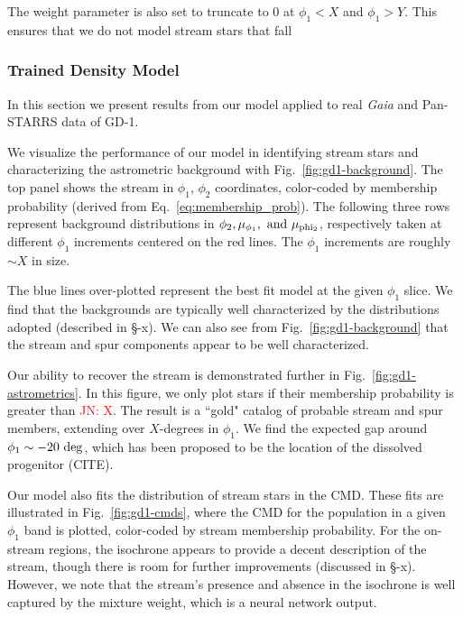 \documentclass[twocolumn]{aastex631}
\newcommand{\JN}[1]{{\textcolor{red}{JN: #1}}}
\begin{document}
            The weight parameter is also set to truncate to $0$ at $\phi_1 < X$ and $\phi_1 > Y$. This ensures that we do not model stream stars that fall 
        
        
        \subsubsection{Trained Density Model}\label{ssub:trained_gd1}
    
            In this section we present results from our model applied to real {\it Gaia} and Pan-STARRS data of GD-1. 

            We visualize the performance of our model in identifying stream stars and characterizing the astrometric background with Fig.~\ref{fig:gd1-background}. The top panel shows the stream in $\phi_1$, $\phi_2$ coordinates, color-coded by membership probability (derived from Eq.~\ref{eq:membership_prob}). The following three rows represent background distributions in $\phi_2, \mu_{\phi_1}, \rm{\ and} \ \mu_{\rm phi_2}$, respectively taken at different $\phi_1$ increments centered on the red lines. The $\phi_1$ increments are roughly $\sim X$ in size. 

            The blue lines over-plotted represent the best fit model at the given $\phi_1$ slice. We find that the backgrounds are typically well characterized by the distributions adopted (described in \S-x). We can also see from Fig.~\ref{fig:gd1-background}
            that the stream and spur components appear to be well characterized. 
            
            Our ability to recover the stream is demonstrated further in Fig.~\ref{fig:gd1-astrometrics}. In this figure, we only plot stars if their membership probability is greater than \JN{X}. The result is a ``gold" catalog of probable stream and spur members, extending over $X$-degrees in $\phi_1$. We find the expected gap around $\phi_1 \sim -20~\rm{deg}$, which has been proposed to be the location of the dissolved progenitor (CITE).

            Our model also fits the distribution of stream stars in the CMD. These fits are illustrated in Fig.~\ref{fig:gd1-cmds}, where the CMD for the population in a given $\phi_1$ band is plotted, color-coded by stream membership probability. For the on-stream regions, the isochrone appears to provide a decent description of the stream, though there is room for further improvements (discussed in \S-x). However, we note that the stream's presence and absence in the isochrone is well captured by the mixture weight, which is a neural network output. 
            
\end{document}
